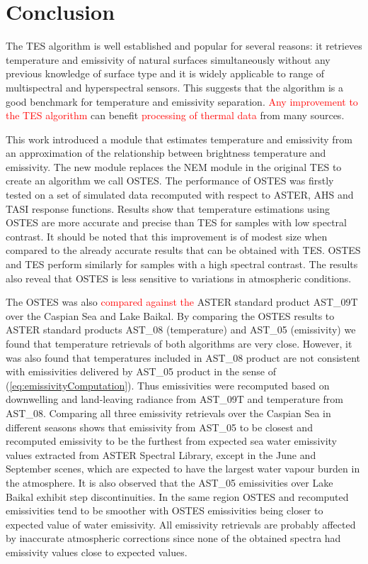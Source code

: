\chapter{Conclusion}

The TES algorithm is well established and popular for several reasons: it retrieves temperature and emissivity of natural surfaces simultaneously without any previous knowledge of surface type and it is widely applicable to range of multispectral and hyperspectral sensors. This suggests that the algorithm is a good benchmark for temperature and emissivity separation. \textcolor{red}{Any improvement to the TES algorithm} can benefit \textcolor{red}{processing of thermal data} from many sources.

This work introduced a module that estimates temperature and emissivity from an approximation of the relationship between brightness temperature and emissivity. The new module replaces the NEM module in the original TES to create an algorithm we call OSTES. The performance of OSTES was firstly tested on a set of simulated data recomputed with respect to ASTER, AHS and TASI response functions. Results show that temperature estimations using OSTES are more accurate and precise than TES for samples with low spectral contrast. It should be noted that this improvement is of modest size when compared to the already accurate results that can be obtained with TES. OSTES and TES perform similarly for samples with a high spectral contrast. The results also reveal that OSTES is less sensitive to  variations in atmospheric conditions.

The OSTES was also \textcolor{red}{compared against the} ASTER standard product AST\_09T over the Caspian Sea and Lake Baikal. By comparing the OSTES results to ASTER standard products AST\_08 (temperature) and AST\_05 (emissivity) we found that temperature retrievals of both algorithms are very close. However, it was also found that temperatures included in AST\_08 product are not consistent with emissivities delivered by AST\_05 product in the sense of (\ref{eq:emissivityComputation}). Thus emissivities were recomputed based on downwelling and land-leaving radiance from AST\_09T and temperature from AST\_08. Comparing all three emissivity retrievals over  {the} Caspian Sea in different seasons shows that emissivity from AST\_05 to be closest and recomputed emissivity to be the furthest from expected sea water emissivity values extracted from ASTER Spectral Library, except in the June  {and September scenes}, which  {are} expected to have the largest water vapour burden in the atmosphere. It is also observed that the AST\_05 emissivities over Lake Baikal exhibit step discontinuities. In the same region OSTES and recomputed emissivities tend to be smoother with OSTES emissivities being closer to expected value of water emissivity. All emissivity retrievals are probably affected by inaccurate atmospheric corrections since none of the obtained spectra had emissivity values close to expected values.

